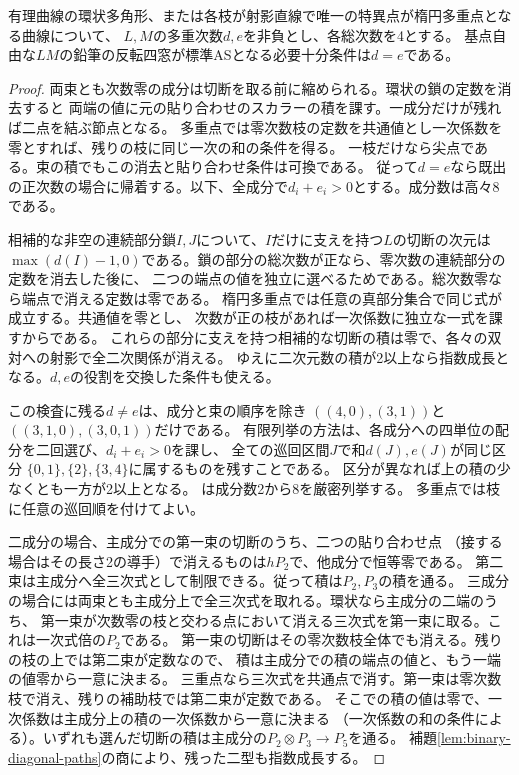 \begin{proposition}[零次数の成分を許した多重次数判定]\label{prop:semipositive-pencil-balance}
有理曲線の環状多角形、または各枝が射影直線で唯一の特異点が楕円多重点となる曲線について、
$L,M$の多重次数$d,e$を非負とし、各総次数を4とする。
基点自由な$LM$の鉛筆の反転四窓が標準ASとなる必要十分条件は$d=e$である。
\end{proposition}
\begin{proof}
両束とも次数零の成分は切断を取る前に縮められる。環状の鎖の定数を消去すると
両端の値に元の貼り合わせのスカラーの積を課す。一成分だけが残れば二点を結ぶ節点となる。
多重点では零次数枝の定数を共通値とし一次係数を零とすれば、残りの枝に同じ一次の和の条件を得る。
一枝だけなら尖点である。束の積でもこの消去と貼り合わせ条件は可換である。
従って$d=e$なら既出の正次数の場合に帰着する。以下、全成分で$d_i+e_i>0$とする。成分数は高々8である。

相補的な非空の連続部分鎖$I,J$について、$I$だけに支えを持つ$L$の切断の次元は
$\max(d(I)-1,0)$である。鎖の部分の総次数が正なら、零次数の連続部分の定数を消去した後に、
二つの端点の値を独立に選べるためである。総次数零なら端点で消える定数は零である。
楕円多重点では任意の真部分集合で同じ式が成立する。共通値を零とし、
次数が正の枝があれば一次係数に独立な一式を課すからである。
これらの部分に支えを持つ相補的な切断の積は零で、各々の双対への射影で全二次関係が消える。
ゆえに二次元数の積が2以上なら指数成長となる。$d,e$の役割を交換した条件も使える。

この検査に残る$d\ne e$は、成分と束の順序を除き
$((4,0),(3,1))$と$((3,1,0),(3,0,1))$だけである。
有限列挙の方法は、各成分への四単位の配分を二回選び、$d_i+e_i>0$を課し、
全ての巡回区間$J$で和$d(J),e(J)$が同じ区分
$\{0,1\},\{2\},\{3,4\}$に属するものを残すことである。
区分が異なれば上の積の少なくとも一方が2以上となる。
は成分数2から8を厳密列挙する。
多重点では枝に任意の巡回順を付けてよい。

二成分の場合、主成分での第一束の切断のうち、二つの貼り合わせ点
（接する場合はその長さ2の導手）で消えるものは$hP_2$で、他成分で恒等零である。
第二束は主成分へ全三次式として制限できる。従って積は$P_2,P_3$の積を通る。
三成分の場合には両束とも主成分上で全三次式を取れる。環状なら主成分の二端のうち、
第一束が次数零の枝と交わる点において消える三次式を第一束に取る。これは一次式倍の$P_2$である。
第一束の切断はその零次数枝全体でも消える。残りの枝の上では第二束が定数なので、
積は主成分での積の端点の値と、もう一端の値零から一意に決まる。
三重点なら三次式を共通点で消す。第一束は零次数枝で消え、残りの補助枝では第二束が定数である。
そこでの積の値は零で、一次係数は主成分上の積の一次係数から一意に決まる
（一次係数の和の条件による）。いずれも選んだ切断の積は主成分の$P_2\otimes P_3\to P_5$を通る。
補題\ref{lem:binary-diagonal-paths}の商により、残った二型も指数成長する。
\end{proof}
